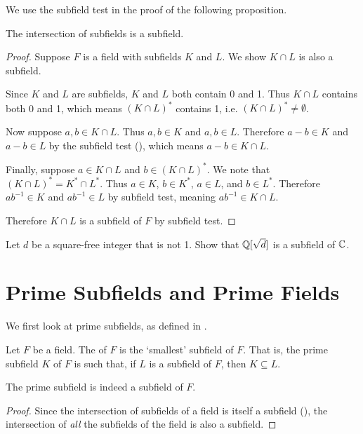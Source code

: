 We use the subfield test in the proof of the following proposition.
\begin{proposition}\label{prop-intersection-of-subfields-is-subfield}
    The intersection of subfields is a subfield.
\end{proposition}
\begin{proof}
    Suppose $F$ is a field with subfields $K$ and $L$. We show $K \cap L$ is also a subfield.

    Since $K$ and $L$ are subfields, $K$ and $L$ both contain 0 and 1. Thus $K \cap L$ contains both 0 and 1, which means $(K \cap L)^\ast$ contains 1, i.e. $(K\cap L)^\ast \neq \emptyset$.

    Now suppose $a, b \in K \cap L$. Thus $a, b \in K$ and $a, b \in L$. Therefore $a - b \in K$ and $a - b \in L$ by the subfield test (), which means $a - b \in K \cap L$.

    Finally, suppose $a \in K \cap L$ and $b \in (K \cap L)^\ast$. We note that $(K \cap L)^\ast = K^\ast \cap L^\ast$. Thus $a \in K$, $b \in K^\ast$, $a \in L$, and $b \in L^\ast$. Therefore $ab^{-1} \in K$ and $ab^{-1} \in L$ by subfield test, meaning $ab^{-1} \in K \cap L$.

    Therefore $K \cap L$ is a subfield of $F$ by subfield test.
\end{proof}

\begin{exercise}
    Let $d$ be a square-free integer that is not 1. Show that $\mathbb{Q}[\sqrt{d}]$ is a subfield of $\mathbb{C}$.
\end{exercise}

\section{Prime Subfields and Prime Fields}
We first look at prime subfields, as defined in \cite[p.~268]{gallian_2016}.

\begin{definition}\label{definition-prime-subfield}
    Let $F$ be a field. The  of $F$ is the `smallest' subfield of $F$. That is, the prime subfield $K$ of $F$ is such that, if $L$ is a subfield of $F$, then $K \subseteq L$.
\end{definition}
\begin{proposition}
    The prime subfield is indeed a subfield of $F$.
\end{proposition}
\begin{proof}
    Since the intersection of subfields of a field is itself a subfield (), the intersection of \textit{all} the subfields of the field is also a subfield.
\end{proof}

